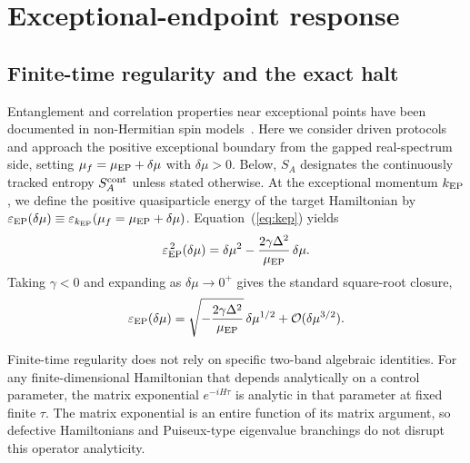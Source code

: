 \documentclass[aps,prb,reprint,superscriptaddress,amsmath,amssymb,floatfix]{revtex4-2}
\begin{document}
\section{Exceptional-endpoint response}
\label{sec:exceptional}

\subsection{Finite-time regularity and the exact halt}
\label{sec:finite_endpoint}

  Entanglement and correlation properties near exceptional points have been documented in non-Hermitian spin models~\cite{Miao2024}. Here we consider driven protocols and approach the positive exceptional boundary from the gapped real-spectrum side, setting $\mu_f=\mu_{\rm EP}+\delta\mu$ with $\delta\mu>0$. Below, $S_A$ designates the continuously tracked entropy $S_A^{\rm cont}$ unless stated otherwise. At the exceptional momentum $k_{\rm EP}$, we define the positive quasiparticle energy of the target Hamiltonian by $\varepsilon_{\rm EP}(\delta\mu)\equiv \varepsilon_{k_{\rm EP}}(\mu_f=\mu_{\rm EP}+\delta\mu)$. Equation~(\ref{eq:kep}) yields
\begin{equation}
\varepsilon_{\rm EP}^{\,2}(\delta\mu) = \delta\mu^2 - \frac{2\gamma\Delta^2}{\mu_{\rm EP}}\, \delta\mu .
\label{eq:eps_ep_exact}
\end{equation}
Taking $\gamma<0$ and expanding as $\delta\mu\to0^+$ gives the standard square-root closure,
\begin{equation}
\varepsilon_{\rm EP}(\delta\mu) = \sqrt{-\frac{2\gamma\Delta^2}{\mu_{\rm EP}}}\, \delta\mu^{1/2} + \mathcal O(\delta\mu^{3/2}).
\label{eq:eps_ep_sqrt}
\end{equation}

Finite-time regularity does not rely on specific two-band algebraic identities. 
For any finite-dimensional Hamiltonian that depends analytically on a control parameter, the matrix exponential $e^{-iH\tau}$ is analytic in that parameter at fixed finite $\tau$. The matrix exponential is an entire function of its matrix argument, so defective Hamiltonians and Puiseux-type eigenvalue branchings do not disrupt this operator analyticity.
\end{document}
